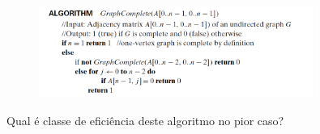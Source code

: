 \documentclass{article}
\begin{document}
\begin{enumerate}
    \begin{figure}[!ht]
        \centering
        \includegraphics[width=0.8\textwidth]{alg_b.PNG}
        \label{fig:my_label}
    \end{figure}
    
    Qual é classe de eficiência deste algoritmo no pior caso? 
\end{enumerate}

%
%
\end{document}

